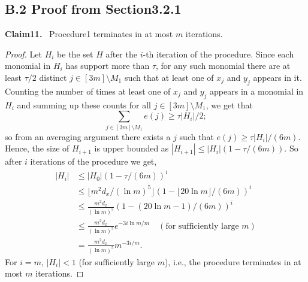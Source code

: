 \documentclass[10pt,a4paper]{article}
\newenvironment{authorclaim}[1]{\par\medskip\noindent\textbf{#1.}\ \ignorespaces}{\par\medskip}
\begin{document}
\subsection*{B.2 Proof from Section3.2.1}
\begin{authorclaim}{Claim11}
Procedure1 terminates in at most $m$ iterations.
\end{authorclaim}
\begin{proof}
Let $H_i$ be the set $H$ after the $i$-th iteration of the procedure. Since each monomial in $H_i$ has support more than $\tau$, for any such monomial there are at least $\tau/2$ distinct $j\in[3m]\setminus M_1$ such that at least one of $x_j$ and $y_j$ appears in it. Counting the number of times at least one of $x_j$ and $y_j$ appears in a monomial in $H_i$ and summing up these counts for all $j\in[3m]\setminus M_1$, we get that
\[
\sum_{j\in[3m]\setminus M_1}e(j)\ge\tau|H_i|/2;
\]
so from an averaging argument there exists a $j$ such that $e(j)\ge\tau|H_i|/(6m)$.
Hence, the size of $H_{i+1}$ is upper bounded as $|H_{i+1}|\le|H_i|(1-\tau/(6m))$.
So after $i$ iterations of the procedure we get,
\begin{align*}
|H_i|&\le|H_0|(1-\tau/(6m))^i\\
&\le\lfloor m^2d_x/(\ln m)^5\rfloor(1-\lfloor20\ln m\rfloor/(6m))^i\\
&\le\frac{m^2d_x}{(\ln m)^5}(1-(20\ln m-1)/(6m))^i\\
&\le\frac{m^2d_x}{(\ln m)^5}e^{-3i\ln m/m}\quad(\text{for sufficiently large }m)\\
&=\frac{m^2d_x}{(\ln m)^5}m^{-3i/m}.
\end{align*}
For $i=m$, $|H_i|<1$ (for sufficiently large $m$), i.e., the procedure terminates in at most $m$ iterations.
\end{proof}
\end{document}
